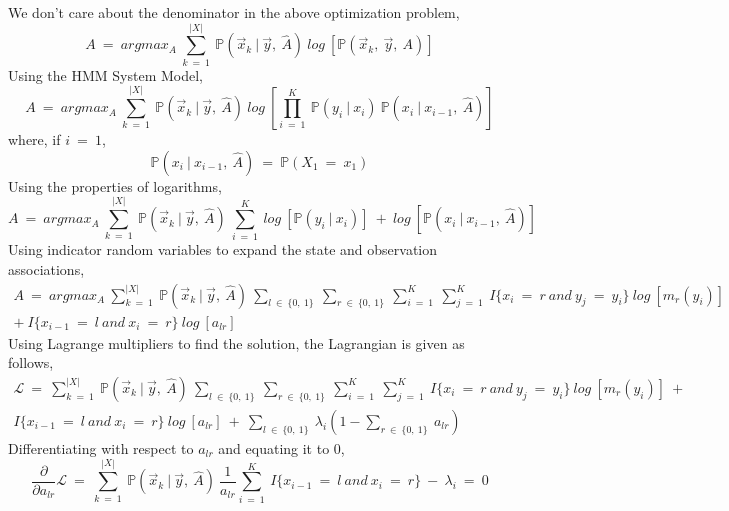 \documentclass[12pt, draftcls, onecolumn]{IEEEtran}
\begin{document}
We don't care about the denominator in the above optimization problem,
\begin{equation}\label{74}
    A\ =\ argmax_A\ \sum_{k\ =\ 1}^{|X|}\ \mathbb{P}(\vec{x}_k\ |\ \vec{y},\ \hat{A})\ log\ [\mathbb{P}(\vec{x}_k,\ \vec{y},\ A)]
\end{equation}
Using the HMM System Model,
\begin{equation}\label{75}
    A\ =\ argmax_A\ \sum_{k\ =\ 1}^{|X|}\ \mathbb{P}(\vec{x}_k\ |\ \vec{y},\ \hat{A})\ log\ [\prod_{i\ =\ 1}^K\ \mathbb{P}(y_i\ |\ x_i)\ \mathbb{P}(x_i\ |\ x_{i-1},\ \hat{A})]
\end{equation}
where, if $i\ =\ 1$,
\[\mathbb{P}(x_i\ |\ x_{i-1},\ \hat{A})\ =\ \mathbb{P}(X_1\ =\ x_1)\]
Using the properties of logarithms,
\begin{equation}\label{76}
    A\ =\ argmax_A\ \sum_{k\ =\ 1}^{|X|}\ \mathbb{P}(\vec{x}_k\ |\ \vec{y},\ \hat{A})\ \sum_{i\ =\ 1}^K\ log\ [\mathbb{P}(y_i\ |\ x_i)]\ +\ log\ [\mathbb{P}(x_i\ |\ x_{i-1},\ \hat{A})]
\end{equation}
Using indicator random variables to expand the state and observation associations,
\begin{equation}\label{77}
    \begin{aligned}
        A\ =\ argmax_A\ \sum_{k\ =\ 1}^{|X|}\ \mathbb{P}(\vec{x}_k\ |\ \vec{y},\ \hat{A})\ \sum_{l\ \in\ \{0,\ 1\}}\ \sum_{r\ \in\ \{0,\ 1\}}\ \sum_{i\ =\ 1}^{K}\ \sum_{j\ =\ 1}^{K}\ I\{x_i\ =\ r\ and\ y_j\ =\ y_i\}\ log\ [m_r(y_i)]\ \\+\ I\{x_{i-1}\ =\ l\ and\ x_i\ =\ r\}\ log\ [a_{lr}]
    \end{aligned}
\end{equation}
Using Lagrange multipliers to find the solution, the Lagrangian is given as follows,
\begin{equation}\label{78}
    \begin{aligned}
        \mathcal{L}\ =\ \sum_{k\ =\ 1}^{|X|}\ \mathbb{P}(\vec{x}_k\ |\ \vec{y},\ \hat{A})\ \sum_{l\ \in\ \{0,\ 1\}}\ \sum_{r\ \in\ \{0,\ 1\}}\ \sum_{i\ =\ 1}^{K}\ \sum_{j\ =\ 1}^{K}\ I\{x_i\ =\ r\ and\ y_j\ =\ y_i\}\ log\ [m_r(y_i)]\ +\ \\I\{x_{i-1}\ =\ l\ and\ x_i\ =\ r\}\ log\ [a_{lr}]\ +\ \sum_{l\ \in\ \{0,\ 1\}}\ \lambda_i(1-\sum_{r\ \in\ \{0,\ 1\}}\ a_{lr})
    \end{aligned}
\end{equation}
Differentiating with respect to $a_{lr}$ and equating it to 0,
\begin{equation}\label{79}
    \frac{\partial}{\partial a_{lr}}\mathcal{L}\ =\ \sum_{k\ =\ 1}^{|X|}\ \mathbb{P}(\vec{x}_k\ |\ \vec{y},\ \hat{A})\ \frac{1}{a_{lr}}\sum_{i\ =\ 1}^{K}\ I\{x_{i-1}\ =\ l\ and\ x_i\ =\ r\}\ -\ \lambda_i\ =\ 0
\end{equation}
\end{document}

